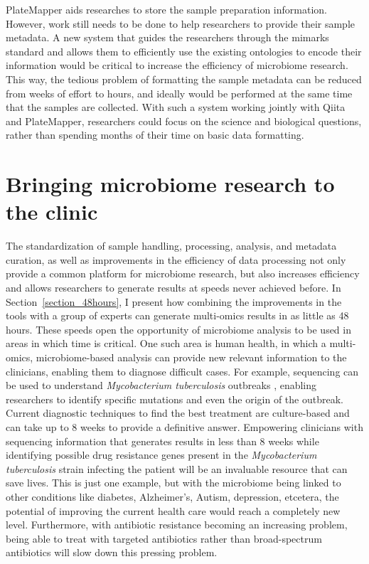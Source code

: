 PlateMapper aids researches to store the sample preparation information. However,
work still needs to be done to help researchers to provide their sample metadata.
A new system that guides the researchers through the \gls{mimarks} standard and
allows them to efficiently use the existing ontologies to encode their
information would be critical to increase the efficiency of microbiome research.
This way, the tedious problem of formatting the sample metadata can be reduced
from weeks of effort to hours, and ideally would be performed at the same time
that the samples are collected. With such a system working jointly with Qiita and
PlateMapper, researchers could focus on the science and biological questions,
rather than spending months of their time on basic data formatting.

\section{Bringing microbiome research to the clinic}

The standardization of sample handling, processing, analysis, and metadata curation,
as well as improvements in the efficiency of data processing not only provide a
common platform for microbiome research, but also increases efficiency and allows
researchers to generate results at speeds never achieved before. In Section~\ref{section_48hours},
I present how combining the improvements in the tools with a group of experts can
generate multi-omics results in as little as 48 hours. These speeds open the
opportunity of microbiome analysis to be used in areas in which time is critical.
One such area is human health, in which a multi-omics, microbiome-based analysis
can provide new relevant information to the clinicians, enabling them to diagnose
difficult cases. For example, sequencing can be used to understand \emph{Mycobacterium tuberculosis}
outbreaks \cite{Guthrie2017}, enabling researchers to identify specific mutations
and even the origin of the outbreak. Current diagnostic techniques to find the
best treatment are culture-based and can take up to 8 weeks to provide a definitive
answer. Empowering clinicians with sequencing information that generates results in
less than 8 weeks while identifying possible drug resistance genes present in the
\emph{Mycobacterium tuberculosis} strain infecting the patient will be an invaluable
resource that can save lives. This is just one example, but with the microbiome
being linked to other conditions like diabetes, Alzheimer’s, Autism, depression,
etcetera, the potential of improving the current health care would reach a completely
new level. Furthermore, with antibiotic resistance becoming an increasing problem,
being able to treat with targeted antibiotics rather than broad-spectrum antibiotics
will slow down this pressing problem.

